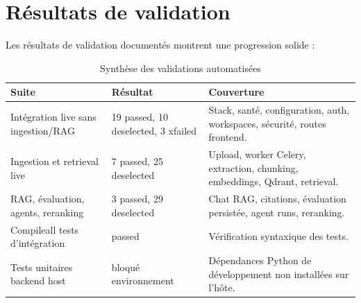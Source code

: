 \documentclass[12pt,a4paper,oneside]{report}
\begin{document}
\section{Résultats de validation}
Les résultats de validation documentés montrent une progression solide :
\begin{table}[H]
  \centering
  \caption{Synthèse des validations automatisées}
  \begin{tabularx}{\textwidth}{L{4cm}L{3cm}Y}
    \toprule
    \textbf{Suite} & \textbf{Résultat} & \textbf{Couverture} \\
    \midrule
    Intégration live sans ingestion/RAG & 19 passed, 10 deselected, 3 xfailed & Stack, santé, configuration, auth, workspaces, sécurité, routes frontend. \\
    Ingestion et retrieval live & 7 passed, 25 deselected & Upload, worker Celery, extraction, chunking, embeddings, Qdrant, retrieval. \\
    RAG, évaluation, agents, reranking & 3 passed, 29 deselected & Chat RAG, citations, évaluation persistée, agent runs, reranking. \\
    Compileall tests d'intégration & passed & Vérification syntaxique des tests. \\
    Tests unitaires backend host & bloqué environnement & Dépendances Python de développement non installées sur l'hôte. \\
    \bottomrule
  \end{tabularx}
\end{table}
\end{document}
